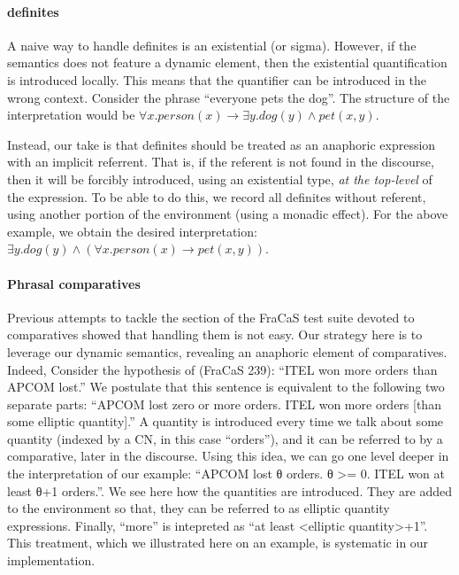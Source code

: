 \documentclass{article}
\begin{document}
\paragraph{definites} A naive way to handle definites is an
existential (or sigma). However, if the semantics does not feature a
dynamic element, then the existential quantification is introduced
locally. This means that the quantifier can be introduced in the wrong
context. Consider the phrase ``everyone pets the dog''. The structure
of the interpretation would be
$∀x. person(x) → ∃y. dog(y) ∧ pet(x,y)$.

Instead, our take is that definites should be treated as an anaphoric
expression with an implicit referrent. That is, if the referent is not
found in the discourse, then it will be forcibly introduced, using an
existential type, \emph{at the top-level} of the expression. To be
able to do this, we record all definites without referent, using
another portion of the environment (using a monadic effect). For the
above example, we obtain the desired interpretation:
$∃y. dog(y) ∧ (∀x. person(x) → pet(x,y))$.

\paragraph{Phrasal comparatives}
Previous attempts to tackle the section of the FraCaS test suite
devoted to comparatives showed that handling them is not easy. Our
strategy here is to leverage our dynamic semantics, revealing an
anaphoric element of comparatives. Indeed, Consider the hypothesis of
(FraCaS 239): ``ITEL won more orders than APCOM lost.''  We postulate
that this sentence is equivalent to the following two separate parts:
``APCOM lost zero or more orders. ITEL won more orders [than some
elliptic quantity].''  A quantity is introduced every time we talk
about some quantity (indexed by a CN, in this case ``orders''), and it
can be referred to by a comparative, later in the discourse. Using
this idea, we can go one level deeper in the interpretation of our
example: ``APCOM lost θ orders. θ >= 0.  ITEL won at least θ+1
orders.''. We see here how the quantities are introduced. They are
added to the environment so that, they can be referred to as elliptic
quantity expressions. Finally, ``more'' is intepreted as ``at least
<elliptic quantity>+1''. This treatment, which we illustrated here on
an example, is systematic in our implementation.
\end{document}
